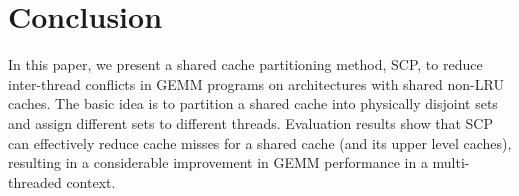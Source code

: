 \section{Conclusion}\label{sec:conclusion}
In this paper, we present a shared cache partitioning method,
SCP, to reduce inter-thread conflicts in GEMM programs
on architectures with shared non-LRU caches.
The basic idea is to partition a shared cache into physically
disjoint sets and assign different sets to different threads.
Evaluation results show that SCP can effectively reduce
cache misses for a shared cache (and its
upper level caches),
resulting in a considerable improvement in GEMM performance
in a multi-threaded context.

